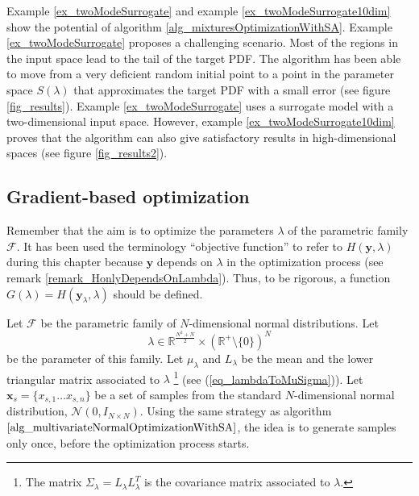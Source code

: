 Example \ref{ex_twoModeSurrogate} and example \ref{ex_twoModeSurrogate10dim} show the potential of algorithm \ref{alg_mixturesOptimizationWithSA}. Example \ref{ex_twoModeSurrogate} proposes a challenging scenario. Most of the regions in the input space lead to the tail of the target PDF. The algorithm has been able to move from a very deficient random initial point to a point in the parameter space $S(\lambda)$ that approximates the target PDF with a small error (see figure \ref{fig_results}). Example \ref{ex_twoModeSurrogate} uses a surrogate model with a two-dimensional input space. However, example \ref{ex_twoModeSurrogate10dim} proves that the algorithm can also give satisfactory results in high-dimensional spaces (see figure \ref{fig_results2}).

\subsection{Gradient-based optimization} \label{sec_gradientBasedOptimization}


Remember that the aim is to optimize the parameters $\lambda$ of the parametric family $\mathcal{F}$. 
It has been used the terminology ``objective function'' to refer to $H(\pmb{y}, \lambda)$ during this chapter because  $\pmb{y}$ depends on $\lambda$ in the optimization process (see remark \ref{remark_HonlyDependsOnLambda}).
Thus, to be rigorous, a function $G(\lambda) = H(\pmb{y}_{\lambda},\lambda)$ should be defined.


Let $\mathcal{F}$ be the parametric family of $N$-dimensional normal distributions.
Let 
$$
  \lambda \in \mathbb{R}^{\frac{N^2+N}{2}} \times (\mathbb{R}^+\setminus\{0\})^N
$$ 
be the parameter of this family.
Let $\mu_{\lambda}$ and $L_{\lambda}$ be the mean and the lower triangular matrix associated to $\lambda$
\footnote{The matrix $\Sigma_{\lambda} = L_{\lambda}L_{\lambda}^T$ is the covariance matrix associated to $\lambda$.}
(see (\ref{eq_lambdaToMuSigma})).
Let $\pmb{x}_s = \{x_{s,1} \dots x_{s,n}\}$ be a set of samples from the standard $N$-dimensional normal distribution, $\mathcal{N}(0,I_{N \times N})$.
Using the same strategy as algorithm $\ref{alg_multivariateNormalOptimizationWithSA}$, the idea is to generate samples only once, before the optimization process starts. 


